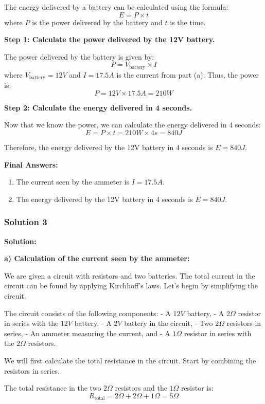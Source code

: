 \documentclass{article}
\begin{document}
The energy delivered by a battery can be calculated using the formula:
\[
E = P \times t
\]
where \(P\) is the power delivered by the battery and \(t\) is the time.

\textbf{Step 1: Calculate the power delivered by the 12V battery.}

The power delivered by the battery is given by:
\[
P = V_{\text{battery}} \times I
\]
where \(V_{\text{battery}} = 12V\) and \(I = 17.5A\) is the current from part (a). Thus, the power is:
\[
P = 12V \times 17.5A = 210W
\]

\textbf{Step 2: Calculate the energy delivered in 4 seconds.}

Now that we know the power, we can calculate the energy delivered in 4 seconds:
\[
E = P \times t = 210W \times 4s = 840J
\]

Therefore, the energy delivered by the 12V battery in 4 seconds is \(E = 840J\).

\textbf{Final Answers:}
\begin{enumerate}
    \item The current seen by the ammeter is \(I = 17.5A\).
    \item The energy delivered by the 12V battery in 4 seconds is \(E = 840J\).
\end{enumerate}


\subsubsection{Solution 3}
\textbf{Solution:}

\textbf{a) Calculation of the current seen by the ammeter:}

We are given a circuit with resistors and two batteries. The total current in the circuit can be found by applying Kirchhoff’s laws. Let’s begin by simplifying the circuit.

The circuit consists of the following components:
- A $12V$ battery,
- A $2\Omega$ resistor in series with the $12V$ battery,
- A $2V$ battery in the circuit,
- Two $2\Omega$ resistors in series,
- An ammeter measuring the current, and
- A $1\Omega$ resistor in series with the $2\Omega$ resistors.

We will first calculate the total resistance in the circuit. Start by combining the resistors in series.

The total resistance in the two $2\Omega$ resistors and the $1\Omega$ resistor is:
\[
R_{\text{total}} = 2\Omega + 2\Omega + 1\Omega = 5\Omega
\]
\end{document}
